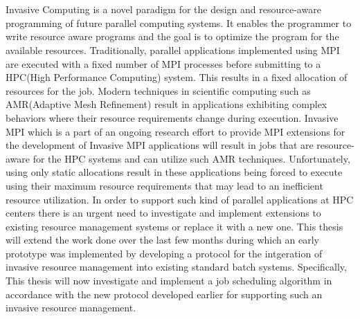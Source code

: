 \chapter{\abstractname}
Invasive Computing is a novel paradigm for the design and resource-aware programming of future parallel computing systems. It enables the programmer to write resource aware programs and the goal is to optimize the program for the available resources. Traditionally, parallel applications implemented using MPI are executed with a fixed number of MPI processes before submitting to a HPC(High Performance Computing) system. This results in a fixed allocation of resources for the job. Modern techniques in scientific computing such as AMR(Adaptive Mesh Refinement) result in applications exhibiting complex behaviors where their resource requirements change during execution. Invasive MPI which is a part of an ongoing research effort to provide MPI extensions for the development of Invasive MPI applications will result in jobs that are resource-aware for the HPC systems and can utilize such AMR techniques. Unfortunately, using only static allocations result in these applications being forced to execute using their maximum resource requirements that may lead to an inefficient resource utilization. In order to support such kind of parallel applications at HPC centers there is an urgent need to investigate and implement extensions to existing resource management systems or replace it with a new one. This thesis will extend the work done over the last few months during which an early prototype was implemented by developing a protocol for the intgeration of invasive resource management into existing standard batch systems. Specifically, This thesis will now investigate and implement a job scheduling algorithm in accordance with the new protocol developed earlier for supporting such an invasive resource management.\par




